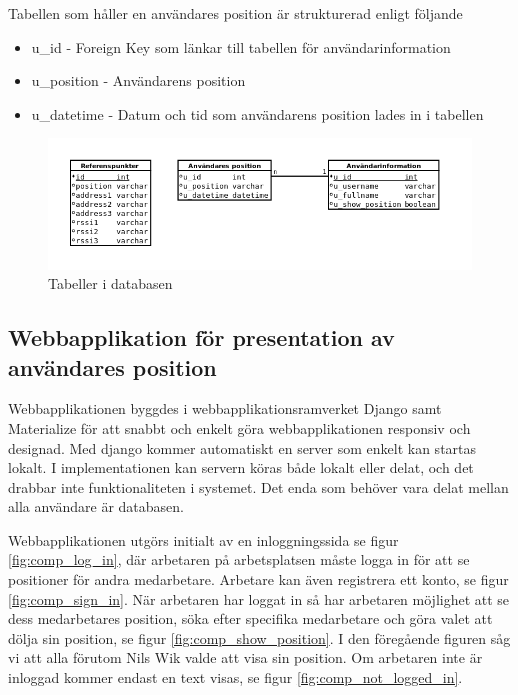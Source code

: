 \documentclass[swedish, a4paper,12pt]{article}
\begin{document}
Tabellen som håller en användares position är strukturerad enligt följande
\begin{itemize}
  \item u\_id - Foreign Key som länkar till tabellen för användarinformation
  \item u\_position - Användarens position
  \item u\_datetime - Datum och tid som användarens position lades in i tabellen
\end{itemize}

\begin{figure}[H]
  \includegraphics[width=15cm]{media/db_tabeller.png}
  \caption{Tabeller i databasen}
  \label{fig:db_tabeller}
\end{figure}

\subsection{Webbapplikation för presentation av användares position} \label{webbinterface}
Webbapplikationen byggdes i webbapplikationsramverket Django samt Materialize
för att snabbt och enkelt göra webbapplikationen responsiv och designad. %
Med django kommer automatiskt en server som enkelt kan startas lokalt. I implementationen kan servern köras både lokalt eller delat, och det drabbar inte funktionaliteten i systemet. Det enda som behöver vara delat mellan alla användare är databasen.

Webbapplikationen utgörs initialt av en inloggningssida se figur \ref{fig:comp_log_in}, där arbetaren på arbetsplatsen måste logga in för att se positioner för andra medarbetare. Arbetare kan även registrera ett konto, se figur \ref{fig:comp_sign_in}. När arbetaren har loggat in så har arbetaren möjlighet att se dess medarbetares position, söka efter specifika medarbetare och göra valet att dölja sin position, se figur \ref{fig:comp_show_position}. I den föregående figuren såg vi att alla förutom Nils Wik valde att visa sin position. Om arbetaren inte är inloggad kommer endast en text visas, se figur \ref{fig:comp_not_logged_in}.
\end{document}
